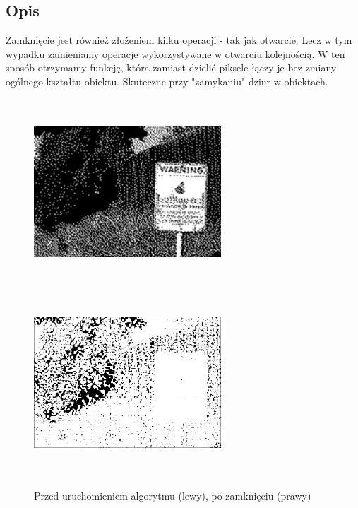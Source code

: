 \documentclass[a4paper,12pt]{book}
\begin{document}
\subsection{Opis}
Zamknięcie jest również złożeniem kilku operacji - tak jak otwarcie. Lecz w tym wypadku zamieniamy operacje wykorzystywane w otwarciu kolejnością. W ten sposób otrzymamy funkcję, która zamiast dzielić piksele łączy je bez zmiany ogólnego kształtu obiektu. Skuteczne przy "zamykaniu" dziur w obiektach. 
\begin{figure}[H]
	\caption{Przed uruchomieniem algorytmu (lewy), po zamknięciu (prawy)}
	\includegraphics[width=7cm, height=7cm]{binary-unmodified.png}
	\includegraphics[width=7cm, height=7cm]{binary-closing.png}
\end{figure}
\end{document}
